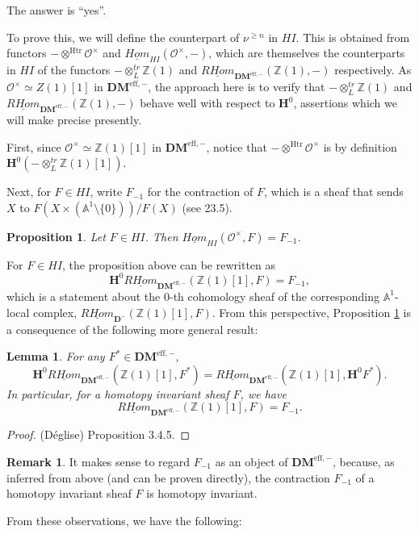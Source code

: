 \documentclass[11pt]{amsart}
\numberwithin{equation}{section}
\theoremstyle{plain} %
\newtheorem{lem}[equation]{Lemma}
\newtheorem{prop}[equation]{Proposition}
\theoremstyle{definition}
\newtheorem{rmk}[equation]{Remark}
\newcommand{\D}{\mathbf{D}}
\newcommand{\DMm}{\mathbf{DM}^{\mathrm{eff},-}}
\newcommand{\A}{\mathbb{A}^1}
\newcommand{\Gm}{\mathbb{A}^1 \setminus \{0\}}
\newcommand{\HI}{HI}
\newcommand{\tDM}{\otimes_{L}^{tr}}
\newcommand{\rhomDM}{\underline{RHom}_{\DMm}}
\newcommand{\rhom}{\underline{RHom}_{\D^-}}
\renewcommand{\H}{\mathbf{H}}
\newcommand{\tHI}{\otimes^{\mathrm{Htr}}}
\newcommand{\ihomHI}{\underline{Hom}_{\HI}}
\newcommand{\Ox}{\mathcal{O}^{\times}}
\newcommand{\Z}{\mathbb{Z}}
\newcommand{\slice}[1]{\nu^{#1}}
\begin{document}
The answer is ``yes''.

To prove this, we will define the counterpart of $\slice{\geq n}$ 
in $\HI$. This is obtained from functors $-\tHI\Ox$ and 
$\ihomHI(\Ox, -)$, which are themselves the counterparts in
$\HI$ of the functors $-\tDM\Z(1)$ and $\rhomDM(\Z(1), -)$ 
respectively. As $\Ox \simeq Z(1)[1]$ in $\DMm$, the approach 
here is to verify that $-\tDM\Z(1)$ and $\rhomDM(\Z(1), -)$ 
behave well with respect to $\H^0$, assertions which we will make 
precise presently.

First, since $\Ox \simeq \Z(1)[1]$ in $\DMm$, notice that $-\tHI \Ox$
is by definition $\H^0(-\tDM \Z(1)[1])$. 

Next, for $F \in \HI$, write $F_{-1}$ for the contraction of $F$,
which is a sheaf that sends $X$ to $F(X \times (\Gm))/F(X)$
(see \cite{MVW} 23.5). 

\begin{prop}\label{homhicontract}
Let $F \in \HI$. Then $\ihomHI(\Ox, F) = F_{-1}$.
\end{prop}

For $F \in \HI$, the proposition above can be rewritten as 
\[
\H^0\rhomDM(\Z(1)[1], F) = F_{-1},
\] 
which is a statement about the 0-th cohomology sheaf 
of the corresponding $\A$-local complex, $\rhom(\Z(1)[1], F)$.
From this perspective, Proposition \ref{homhicontract} is a
consequence of the following more general result:

\begin{lem}\label{homhi}
For any $F^* \in \DMm$,
\[
\H^0\rhomDM(\Z(1)[1], F^*) = \rhomDM(\Z(1)[1],  \H^0F^*).
\]
In particular, for a homotopy invariant sheaf $F$, 
we have 
\[
\rhomDM(\Z(1)[1], F) = F_{-1}.
\]
\end{lem}

\begin{proof}
(D\'eglise) \cite{Deg08b} Proposition 3.4.5.
\end{proof}


\begin{rmk}
It makes sense to regard $F_{-1}$ as an object of $\DMm$,
because, as inferred from above (and can be proven directly),
the contraction $F_{-1}$ of a homotopy invariant sheaf $F$ is 
homotopy invariant. 
\end{rmk}

From these observations, we have the following:
\end{document}
